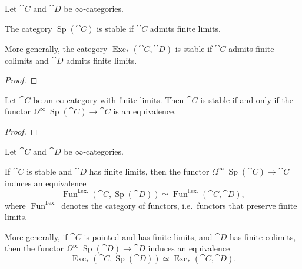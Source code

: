 \begin{proposition}
    Let $\cat{C}$ and $\cat{D}$ be $\infty$-categories.

    \begin{itms}
        \item
        The category $\operatorname{Sp}(\cat{C})$ is stable
        if $\cat{C}$ admits finite limits.

        \item
        More generally, the category $\operatorname{Exc}_*(\cat{C},\cat{D})$
        is stable if $\cat{C}$ admits finite colimits and 
        $\cat{D}$ admits finite limits.
    \end{itms}
\end{proposition}

\begin{proof}
    \nyw
\end{proof}

\begin{proposition}
    Let $\cat{C}$ be an $\infty$-category with finite limits.
    Then $\cat{C}$ is stable if and only if the functor 
    $\Omega^\infty\:\operatorname{Sp}(\cat{C})\to\cat{C}$
    is an equivalence.
\end{proposition}

\begin{proof}
    \nyw
\end{proof}

\begin{proposition}
    Let $\cat{C}$ and $\cat{D}$ be $\infty$-categories.

    \begin{itms}
        \item 
        If $\cat{C}$ is stable and $\cat{D}$ has finite limits,
        then the functor $\Omega^\infty\:\operatorname{Sp}(\cat{C})\to\cat{C}$
        induces an equivalence
        \[\operatorname{Fun}^{\mathrm{l.ex.}}(\cat{C},\operatorname{Sp}(\cat{D}))
        \simeq\operatorname{Fun}^{\mathrm{l.ex.}}(\cat{C},\cat{D}),\]
        where $\operatorname{Fun}^{\mathrm{l.ex.}}$
        denotes the category of  functors,
        i.e.\ functors that preserve finite limits.
        \item 
        More generally, if $\cat{C}$ is pointed and has finite limits,
        and $\cat{D}$ has finite colimits, then the functor
        $\Omega^\infty\:\operatorname{Sp}(\cat{D})\to\cat{D}$
        induces an equivalence
        \[\operatorname{Exc}_*(\cat{C},\operatorname{Sp}(\cat{D}))
        \simeq\operatorname{Exc}_*(\cat{C},\cat{D}).\]
    \end{itms}
\end{proposition}

